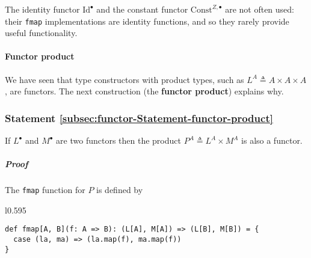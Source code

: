 The identity functor $\text{Id}^{\bullet}$ and the constant functor
$\text{Const}^{Z,\bullet}$ are not often used: their \lstinline!fmap!
implementations are identity functions, and so they rarely provide
useful functionality. 

\paragraph{Functor product}

We have seen that type constructors with product types, such as $L^{A}\triangleq A\times A\times A$,
are functors. The next construction (the \textbf{functor
product}) explains why.

\subsubsection{Statement \label{subsec:functor-Statement-functor-product}\ref{subsec:functor-Statement-functor-product}}

If $L^{\bullet}$ and $M^{\bullet}$ are two functors then the product
$P^{A}\triangleq L^{A}\times M^{A}$ is also a functor.

\subparagraph{Proof}

The \lstinline!fmap! function for $P$ is defined by

\begin{wrapfigure}{l}{0.595\columnwidth}%
\vspace{-0.8\baselineskip}
\begin{lstlisting}
def fmap[A, B](f: A => B): (L[A], M[A]) => (L[B], M[B]) = {
  case (la, ma) => (la.map(f), ma.map(f))
}
\end{lstlisting}

\vspace{-1.5\baselineskip}
\end{wrapfigure}%

